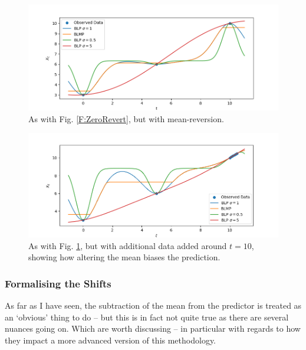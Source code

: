 \documentclass{article}
\newcounter{version}
\begin{document}
			\begin{figure}
				\includegraphics[width=\linewidth,keepaspectratio=true]{Figs/meanReversion.png}
				\caption{As with Fig. \ref{F:ZeroRevert}, but with mean-reversion.}\label{F:MeanRevert}
			\end{figure}

			\begin{figure}
				\includegraphics[width=\linewidth,keepaspectratio=true]{Figs/MeanReversion_Additional}
				\caption{As with Fig. \ref{F:MeanRevert}, but with additional data added around $t=10$, showing how altering the mean biases the prediction.}\label{F:MeanRevert_More}
			\end{figure}
		\subsubsection*{Formalising the Shifts}

			As far as I have seen, the subtraction of the mean from the predictor is treated as an `obvious' thing to do -- but this is in fact not quite true as there are several nuances going on. Which are worth discussing -- in particular with regards to how they impact a more advanced version of this methodology. 
\end{document}
